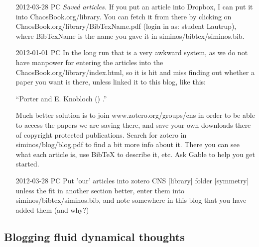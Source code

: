 \begin{itemize}

\item[2012-03-28 PC] \emph{Saved articles.} If you put an article into
Dropbox, I can put it into 
{ChaosBook.org/library}. You can fetch it from there by clicking on
ChaosBook.org/library/BibTexName.pdf (login in as: student Lautrup),
where BibTexName is the name you gave it in siminos/bibtex/siminos.bib.

\item[2012-01-01 PC] In the long run that is a very awkward system, as we
do not have manpower for entering the articles into the
ChaosBook.org/library/index.html, so it is hit and miss finding out
whether a paper you want is there, unless linked it to this blog, like
this:

``Porter and E. Knobloch
()
.''

Much better solution is to join 
{www.zotero.org/groups/cns} in order to be able to access the papers we
are saving there, and save your own downloads there of copyright
protected publications. Search for zotero in siminos/blog/blog.pdf to
find a bit more info about it. There you can see what each article is,
use BibTeX to describe it, etc. Ask Gable to help you get started.

\item[2012-03-28 PC]
Put 'our' articles into zotero CNS [library] folder [symmetry] unless the
fit in another section better, enter them into
siminos/bibtex/siminos.bib, and note somewhere in this blog that you have
added them (and why?)


\end{itemize}

\subsection{Blogging fluid dynamical thoughts}

